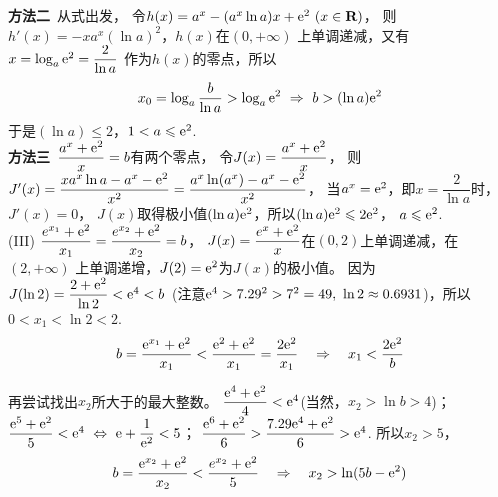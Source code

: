 \begin{enumerate}[label={【\textbf{例\thechapter.\arabic*}】},
 leftmargin=\inteval{\myenumleftmargin}pt,
 itemsep=\inteval{\myenumitempsep}pt,
 itemindent=\inteval{\myenumitemindent}pt]
\textbf{方法二}\ 从式出发，
令$ h(x)=a^{x}-(a^{x}\ln a)x+\mathrm{e}^2\ (x\in \textbf{R}) $，
则$ h'(x)=-xa^x(\ln a)^2 $，$ h(x) $在$ (0,+\infty) $
上单调递减，又有$ x=\log_a \mathrm{e}^2=\dfrac{2}{\ln a} $
作为$ h(x) $的零点，所以
\begin{gather*}
    x_0=\log_a\dfrac{b}{\ln a}> \log_a \e^2\ 
    \Rightarrow\  b>(\ln a)\e^2
\end{gather*}
于是$ (\ln a)\leq 2 $，$ 1<a\leqslant \mathrm{e}^2 $. \\
\textbf{方法三}\ $ \dfrac{a^x+\mathrm{e}^2}{x}=b $有两个零点，
令$ J(x)=\dfrac{a^x+\mathrm{e}^2}{x} $，
则$ J'(x)=\dfrac{xa^x\ln a-a^x-\mathrm{e}^2}{x^2}=
\dfrac{a^x\ln (a^x)-a^x-\mathrm{e}^2}{x^2} $，
当$ a^x=\mathrm{e}^2 $，即$ x=\dfrac{2}{\ln a} $时，$ J'(x)=0 $，
$ J(x) $取得极小值$ (\ln a)\mathrm{e}^2 $，所以$ (\ln a)\mathrm{e}^2\leqslant 2\mathrm{e}^2 $，
$ a\leqslant \mathrm{e}^2 $. \\
(III) $ \dfrac{e^{x_1}+\mathrm{e}^2}{x_1}=\dfrac{e^{x_2}+\mathrm{e}^2}{x_2}=b $，
$ J(x)=\dfrac{e^x+\mathrm{e}^2}{x} $在$ (0,2) $上单调递减，在$ (2,+\infty) $
上单调递增，$ J(2)=\mathrm{e}^2 $为$ J(x) $的极小值。
因为$ J(\ln 2)=\dfrac{2+\mathrm{e}^2}{\ln 2}<\mathrm{e}^4<b $\ 
(注意$ \mathrm{e}^4>7.29^2>7^2=49,\ \ln2\approx 0.6931 $)，所以$ 0<x_1<\ln 2<2 $.
\begin{gather*}
    b=\dfrac{\mathrm{e}^{x_1}+\mathrm{e}^2}{x_1}<\dfrac{\mathrm{e}^2+\mathrm{e}^2}{x_1}
    =\dfrac{2\mathrm{e}^2}{x_1}\quad \Rightarrow \quad x_1<\dfrac{2\mathrm{e}^2}{b}
\end{gather*}

再尝试找出$ x_2 $所大于的最大整数。
$ \dfrac{\mathrm{e}^4+\mathrm{e}^2}{4}<\mathrm{e}^4 $(当然，$ x_2>\ln b>4 $)；
$ \dfrac{\e^5+\e^2}{5}<\e^4\ \Leftrightarrow\ 
\e+\dfrac{1}{\e^2}<5 $；
$ \dfrac{\mathrm{e}^6+\mathrm{e}^2}{6}>\dfrac{7.29\mathrm{e}^4+\mathrm{e}^2}{6}>\mathrm{e}^4 $. 
所以$ x_2>5 $，
\begin{gather*}
    b=\dfrac{\mathrm{e}^{x_2}+\mathrm{e}^2}{x_2}<\dfrac{e^{x_2}+\mathrm{e}^2}{5} \quad
    \Rightarrow\quad x_2>\ln(5b-\mathrm{e}^2)
\end{gather*}


\end{enumerate}
